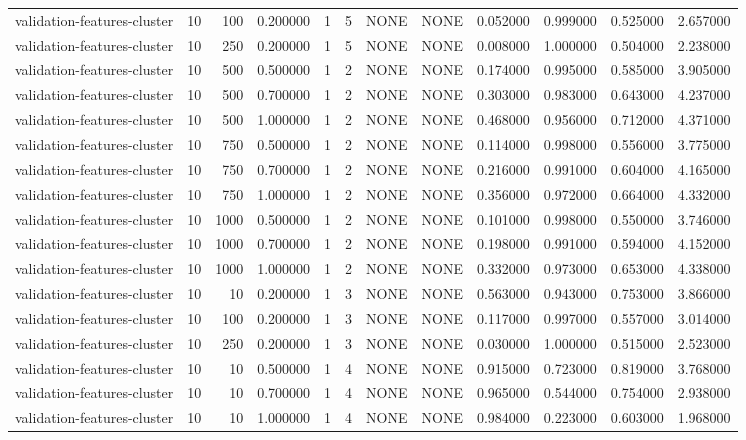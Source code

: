 \begin{tabular}{lrrrllllrrrr}
validation-features-cluster & 10 & 100 & 0.200000 & 1 & 5 & NONE & NONE & 0.052000 & 0.999000 & 0.525000 & 2.657000 \\
validation-features-cluster & 10 & 250 & 0.200000 & 1 & 5 & NONE & NONE & 0.008000 & 1.000000 & 0.504000 & 2.238000 \\
validation-features-cluster & 10 & 500 & 0.500000 & 1 & 2 & NONE & NONE & 0.174000 & 0.995000 & 0.585000 & 3.905000 \\
validation-features-cluster & 10 & 500 & 0.700000 & 1 & 2 & NONE & NONE & 0.303000 & 0.983000 & 0.643000 & 4.237000 \\
validation-features-cluster & 10 & 500 & 1.000000 & 1 & 2 & NONE & NONE & 0.468000 & 0.956000 & 0.712000 & 4.371000 \\
validation-features-cluster & 10 & 750 & 0.500000 & 1 & 2 & NONE & NONE & 0.114000 & 0.998000 & 0.556000 & 3.775000 \\
validation-features-cluster & 10 & 750 & 0.700000 & 1 & 2 & NONE & NONE & 0.216000 & 0.991000 & 0.604000 & 4.165000 \\
validation-features-cluster & 10 & 750 & 1.000000 & 1 & 2 & NONE & NONE & 0.356000 & 0.972000 & 0.664000 & 4.332000 \\
validation-features-cluster & 10 & 1000 & 0.500000 & 1 & 2 & NONE & NONE & 0.101000 & 0.998000 & 0.550000 & 3.746000 \\
validation-features-cluster & 10 & 1000 & 0.700000 & 1 & 2 & NONE & NONE & 0.198000 & 0.991000 & 0.594000 & 4.152000 \\
validation-features-cluster & 10 & 1000 & 1.000000 & 1 & 2 & NONE & NONE & 0.332000 & 0.973000 & 0.653000 & 4.338000 \\
validation-features-cluster & 10 & 10 & 0.200000 & 1 & 3 & NONE & NONE & 0.563000 & 0.943000 & 0.753000 & 3.866000 \\
validation-features-cluster & 10 & 100 & 0.200000 & 1 & 3 & NONE & NONE & 0.117000 & 0.997000 & 0.557000 & 3.014000 \\
validation-features-cluster & 10 & 250 & 0.200000 & 1 & 3 & NONE & NONE & 0.030000 & 1.000000 & 0.515000 & 2.523000 \\
validation-features-cluster & 10 & 10 & 0.500000 & 1 & 4 & NONE & NONE & 0.915000 & 0.723000 & 0.819000 & 3.768000 \\
validation-features-cluster & 10 & 10 & 0.700000 & 1 & 4 & NONE & NONE & 0.965000 & 0.544000 & 0.754000 & 2.938000 \\
validation-features-cluster & 10 & 10 & 1.000000 & 1 & 4 & NONE & NONE & 0.984000 & 0.223000 & 0.603000 & 1.968000 \\

\end{tabular}

